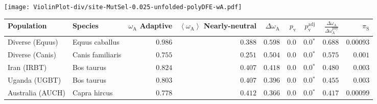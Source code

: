 \begin{center}
\texttt{[image: ViolinPlot-div/site-MutSel-0.025-unfolded-polyDFE-wA.pdf]} 
\begin{adjustbox}{width = 1\textwidth}
\begin{tabular}{|l|l|r|r|r|r|r|r|r|}
\toprule
                     Population &              Species & \specialcell{$\omega_{\mathrm{A}}$ \\ Adaptive} & \specialcell{$\left< \omega_{\mathrm{A}} \right>$ \\ Nearly-neutral} & $\Delta \omega_{\mathrm{A}} $ & $p_{\mathrm{v}}$ & $p_{\mathrm{v}}^{\mathrm{adj}}$ & $\frac{\Delta\omega_{\mathrm{A}}}{\Delta\omega_{\mathrm{A}}^{\mathrm{phy}}}$ & $\pi_{\textrm{S}}$ \\
\midrule
                Diverse (Equus) &       Equus caballus &                                        $ 0.986$ &                                           $ 0.388$ &                      $ 0.598$ &            $0.0$ &                  $\bm{0.0{^*}}$ &                                           $ 0.688$ &          $0.00093$ \\
                Diverse (Canis) &     Canis familiaris &                                        $ 0.755$ &                                           $ 0.251$ &                      $ 0.504$ &            $0.0$ &                  $\bm{0.0{^*}}$ &                                           $ 0.575$ &           $ 0.001$ \\
                    Iran (IRBT) &           Bos taurus &                                        $ 0.824$ &                                           $ 0.407$ &                      $ 0.418$ &            $0.0$ &                  $\bm{0.0{^*}}$ &                                           $ 0.480$ &           $ 0.003$ \\
                  Uganda (UGBT) &           Bos taurus &                                        $ 0.803$ &                                           $ 0.407$ &                      $ 0.396$ &            $0.0$ &                  $\bm{0.0{^*}}$ &                                           $ 0.455$ &           $ 0.003$ \\
               Australia (AUCH) &         Capra hircus &                                        $ 0.778$ &                                           $ 0.412$ &                      $ 0.366$ &            $0.0$ &                  $\bm{0.0{^*}}$ &                                           $ 0.417$ &          $0.00099$ \\

\end{tabular}
\end{adjustbox}
\end{center}
